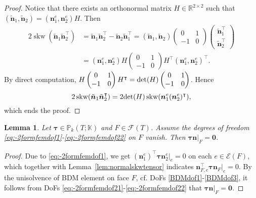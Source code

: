 \documentclass[10pt]{amsart}
\newtheorem{lemma}[theorem]{Lemma}
\newcommand{\skw}{\operatorname{skw}}
\numberwithin{equation}{section}
\begin{document}
\begin{proof}
Notice that there exists an orthonormal matrix $H\in\mathbb R^{2\times2}$ such that 
$(\tilde{\boldsymbol{n}}_1, \tilde{\boldsymbol{n}}_2)=(\boldsymbol{n}_1^e, \boldsymbol{n}_2^e)H$.
Then
\begin{align*}
2\skw(\tilde{\boldsymbol{n}}_1\tilde{\boldsymbol{n}}_2^{\intercal})&=\tilde{\boldsymbol{n}}_1\tilde{\boldsymbol{n}}_2^{\intercal}-\tilde{\boldsymbol{n}}_2\tilde{\boldsymbol{n}}_1^{\intercal}=(\tilde{\boldsymbol{n}}_1, \tilde{\boldsymbol{n}}_2)\begin{pmatrix}
0 & 1 \\
-1 & 0
\end{pmatrix}\begin{pmatrix}
\tilde{\boldsymbol{n}}_1^{\intercal} \\
\tilde{\boldsymbol{n}}_2^{\intercal}  
\end{pmatrix}
\\
&=(\boldsymbol{n}_1^e, \boldsymbol{n}_2^e)H\begin{pmatrix}
0 & 1 \\
-1 & 0
\end{pmatrix}H^{\intercal}(\boldsymbol{n}_1^e, \boldsymbol{n}_2^e)^{\intercal}.
\end{align*}
By direct computation, $H\begin{pmatrix}
0 & 1 \\
-1 & 0
\end{pmatrix}H^{\intercal}={\rm det}(H)\begin{pmatrix}
0 & 1 \\
-1 & 0
\end{pmatrix}$. Hence
$$
2\skw(\tilde{\boldsymbol{n}}_1\tilde{\boldsymbol{n}}_2^{\intercal})=2{\rm det}(H)\skw(\boldsymbol{n}_1^e(\boldsymbol{n}_2^e)^{\intercal}),
$$
which ends the proof.
\end{proof}

\begin{lemma}\label{lem:-2formfemfaceunisolvence}
Let $\boldsymbol{\tau}\in\mathbb P_k(T;\mathbb K)$ and $F\in\mathcal F(T)$.
Assume the degrees of freedom \eqref{eq:-2formfemdof1}-\eqref{eq:-2formfemdof22} on $F$ vanish. 
Then $\boldsymbol{\tau}\boldsymbol{n}|_F=\boldsymbol{0}$.
\end{lemma}
\begin{proof}
Due to \eqref{eq:-2formfemdof1},  we get $(\boldsymbol{n}_1^e)^{\intercal}\boldsymbol{\tau}\boldsymbol{n}_2^e|_e=0$ on each $e\in\mathcal E(F)$, which together with Lemma~\ref{lem:normalskwtensor} indicates $\boldsymbol{n}_{F,e}^{\intercal}\boldsymbol{\tau}\boldsymbol{n}_F|_e=0$. By the unisolvence of BDM element on face $F$, cf. DoFs \eqref{BDMdof1}-\eqref{BDMdof3}, it follows from DoFs \eqref{eq:-2formfemdof21}-\eqref{eq:-2formfemdof22} that $\boldsymbol{\tau}\boldsymbol{n}|_F=\boldsymbol{0}$.
\end{proof}
\end{document}
